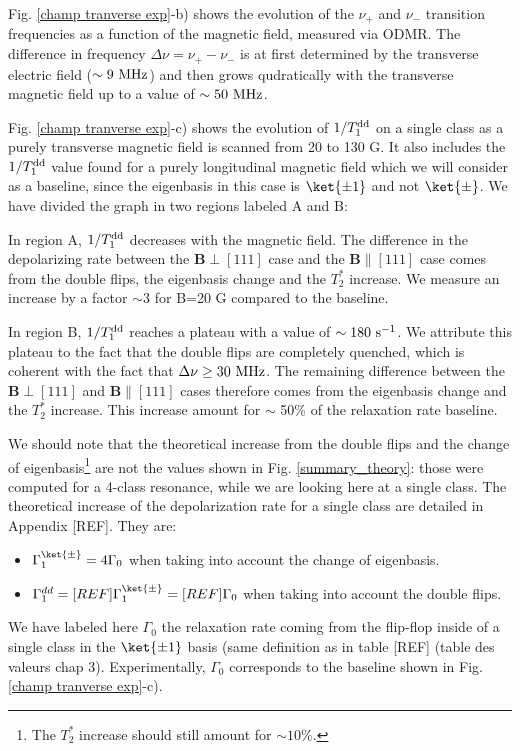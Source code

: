 \documentclass[a4paper, 11pt]{book}
\begin{document}
Fig. \ref{champ tranverse exp}-b) shows the evolution of the $\nu_+$ and $\nu_-$ transition frequencies as a function of the magnetic field, measured via ODMR. The difference in frequency $\Delta \nu = \nu_+ - \nu_-$ is at first determined by the transverse electric field ($\sim 9\ \rm MHz$) and then grows qudratically with the transverse magnetic field up to a value of $\sim 50\ \rm MHz$.

Fig. \ref{champ tranverse exp}-c) shows the evolution of $1/T_1^{\rm dd}$ on a single class as a purely transverse magnetic field is scanned from 20 to 130 G. It also includes the $1/T_1^{\rm dd}$ value found for a purely longitudinal magnetic field which we will consider as a baseline, since the eigenbasis in this case is $\ket{\pm 1}$ and not $\ket{\pm}$. We have divided the graph in two regions labeled A and B:

In region A, $1/T_1^{\rm dd}$ decreases with the magnetic field. The difference in the depolarizing rate between the $\mathbf{B} \perp [111]$ case and the $\mathbf{B} \parallel [111]$ case comes from the double flips, the eigenbasis change and the $T_2^*$ increase. We measure an increase by a factor $\sim 3$ for B=20 G compared to the baseline.

In region B, $1/T_1^{\rm dd}$ reaches a plateau with a value of $\sim 180\ \rm s^{-1}$. We attribute this plateau to the fact that the double flips are completely quenched, which is coherent with the fact that $\Delta \nu \geq 30\ \rm MHz$. The remaining difference between the $\mathbf{B} \perp [111]$ and $\mathbf{B} \parallel [111]$ cases therefore comes from the eigenbasis change and the $T_2^*$ increase. This increase amount for $\sim$ 50\% of the relaxation rate baseline.

We should note that the theoretical increase from the double flips and the change of eigenbasis\footnote{The $T_2^*$ increase should still amount for $\sim 10\%$.} are not the values shown in Fig. \ref{summary_theory}: those were computed for a 4-class resonance, while we are looking here at a single class. The theoretical increase of the depolarization rate for a single class are detailed in Appendix [REF]. They are:
\begin{itemize}
\item $\Gamma_1^{\ket{\pm}}=4 \Gamma_0$ when taking into account the change of eigenbasis.
\item $\Gamma_1^{dd}=[REF]\Gamma_1^{\ket{\pm}}=[REF]\Gamma_0$ when taking into account the double flips.
\end{itemize}
We have labeled here $\Gamma_0$ the relaxation rate coming from the flip-flop inside of a single class in the $\ket{\pm 1}$ basis (same definition as in table [REF] (table des valeurs chap 3). Experimentally, $\Gamma_0$ corresponds to the baseline shown in Fig. \ref{champ tranverse exp}-c).
\end{document}
